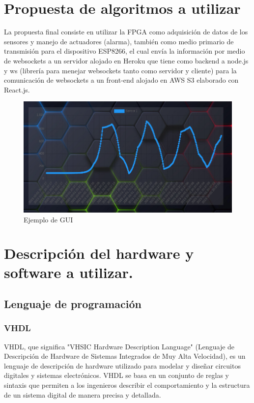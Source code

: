\documentclass[journal]{IEEEtran}
\begin{document}
\section{Propuesta de algoritmos a utilizar}
La propuesta final consiste en utilizar la FPGA como adquisición de datos de los sensores y manejo de actuadores (alarma), también como medio primario de transmisión para el dispositivo ESP8266, el cual envía la información por medio de websockets a un servidor alojado en Heroku que tiene como backend a node.js y ws (librería para menejar websockets tanto como servidor y cliente) para la comunicación de websockets a un front-end alojado en AWS S3 elaborado con React.js.


\begin{figure}[H]
    \begin{center}
        \includegraphics[scale=0.3]{images/Screenshot from 2023-10-01 14-37-32.png}
        \caption{Ejemplo de GUI}
    \end{center}
\end{figure}


\section{Descripción del hardware y software a utilizar.}

\subsection{Lenguaje de programación}

\subsubsection{VHDL}

VHDL, que significa "VHSIC Hardware Description Language" (Lenguaje de Descripción de Hardware de Sistemas Integrados de Muy Alta Velocidad), es un lenguaje de descripción de hardware utilizado para modelar y diseñar circuitos digitales y sistemas electrónicos. VHDL se basa en un conjunto de reglas y sintaxis que permiten a los ingenieros describir el comportamiento y la estructura de un sistema digital de manera precisa y detallada.
\end{document}

